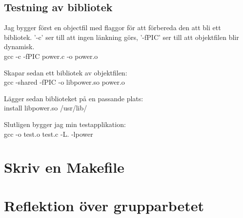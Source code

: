 \documentclass[11pt]{article}
\begin{document}
\subsection*{Testning av bibliotek}
Jag bygger först en objectfil med flaggor för att förbereda den att bli ett bibliotek. '-c' ser till att ingen länkning görs, '-fPIC' ser till att objektfilen blir dynamisk.\\
gcc -c -fPIC power.c -o power.o

Skapar sedan ett bibliotek av objektfilen: \\
gcc -shared -fPIC -o libpower.so power.o

Lägger sedan biblioteket på en passande plats:\\
install libpower.so /usr/lib/

Slutligen bygger jag min testapplikation:\\
gcc -o test.o test.c -L. -lpower

\section{Skriv en Makefile}

\section{Reflektion över grupparbetet}
\end{document}
